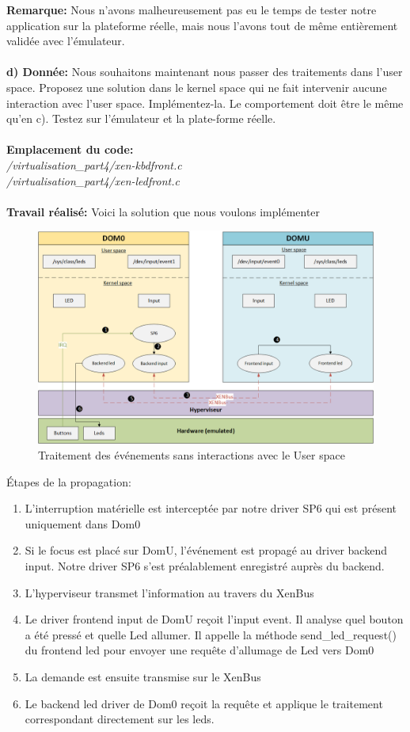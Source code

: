 \textbf{Remarque: }Nous n'avons malheureusement pas eu le temps de tester notre application sur la plateforme réelle, mais nous l'avons tout de même entièrement validée avec l'émulateur.\\\\
\textbf{d) Donnée: }Nous souhaitons maintenant nous passer des traitements dans l’user space. Proposez une solution
dans le kernel space qui ne fait intervenir aucune interaction avec l’user space. Implémentez-la.
Le comportement doit être le même qu’en c). Testez sur l’émulateur et la plate-forme réelle.\\\\
\textbf{Emplacement du code: }\\\textit{/virtualisation\_part4/xen-kbdfront.c}\\
\textit{/virtualisation\_part4/xen-ledfront.c}\\\\
\newpage
\textbf{Travail réalisé: }Voici la solution que nous voulons implémenter
\begin{figure}[H]
	\begin{center}
		\includegraphics[width=17cm]{img/virt5.png}
		\caption{Traitement des événements sans interactions avec le User space}
		\label{virt5}
	\end{center}
\end{figure}
Étapes de la propagation:
\begin{enumerate}
	\item L'interruption matérielle est interceptée par notre driver SP6 qui est présent uniquement dans Dom0
	\item Si le focus est placé sur DomU, l'événement est propagé au driver backend input. Notre driver SP6 s'est préalablement enregistré auprès du backend.
	\item L'hyperviseur transmet l'information au travers du XenBus
	\item Le driver frontend input de DomU reçoit l'input event. Il analyse quel bouton a été pressé et quelle Led allumer. Il appelle la méthode send\_led\_request() du frontend led pour envoyer une requête d'allumage de Led vers Dom0
	\item La demande est ensuite transmise sur le XenBus
	\item Le backend led driver de Dom0 reçoit la requête et applique le traitement correspondant directement sur les leds.
\end{enumerate}
